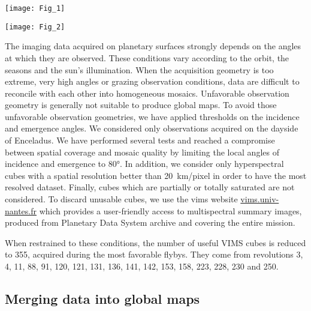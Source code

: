 \documentclass{arxiv-icarus}
\begin{document}
\begin{figure*}[!ht]
    \texttt{[image: Fig\_1]}
    \caption{Global mosaic in equirectangular projection at \SI{1.8}{\um}, containing all the 355 VIMS cubes responding to thresholds mentioned in , before the photometric correction.}
    \label{fig:fig_1}
\end{figure*}

\begin{figure*}[!ht]
    \vspace{.25cm}
    \texttt{[image: Fig\_2]}
    \caption{Global mosaics of incidence, emergence, phase angles and the pixel spatial resolution.}
    \label{fig:fig_2}
\end{figure*}

The imaging data acquired on planetary surfaces strongly depends on the angles at which they are observed. These conditions vary according to the orbit, the seasons and the sun's illumination. When the acquisition geometry is too extreme, \eg very high angles or grazing observation conditions, data are difficult to reconcile with each other into homogeneous mosaics. Unfavorable observation geometry is generally not suitable to produce global maps. To avoid those unfavorable observation geometries, we have applied thresholds on the incidence and emergence angles. We considered only observations acquired on the dayside of Enceladus. We have performed several tests and reached a compromise between spatial coverage and mosaic quality by limiting the local angles of incidence and emergence to \ang{80}. In addition, we consider only hyperspectral cubes with a spatial resolution better than \SI{20}{km/pixel} in order to have the most resolved dataset. Finally, cubes which are partially or totally saturated are not considered. To discard unusable cubes, we use the vims website \href{https://vims.univ-nantes.fr}{vims.univ-nantes.fr} which provides a user-friendly access to multispectral summary images, produced from Planetary Data System archive and covering the entire mission.

When restrained to these conditions, the number of useful VIMS cubes is reduced to 355, acquired during the most favorable flybys. They come from revolutions 3, 4, 11, 88, 91, 120, 121, 131, 136, 141, 142, 153, 158, 223, 228, 230 and 250.


\subsection{Merging data into global maps}
\end{document}
